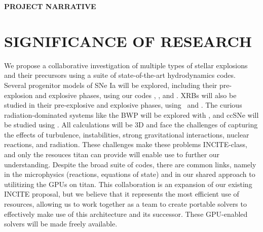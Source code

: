 \documentclass[11pt,letterpaper,english]{article}
\begin{document}
\pagestyle{fancy} 
 \renewcommand{%
\headrulewidth}{0.0pt}

\begin{center}
{\bf PROJECT NARRATIVE}
\end{center}


\section{SIGNIFICANCE OF RESEARCH}


We propose a collaborative investigation of multiple types of stellar
explosions and their precursors using a suite of state-of-the-art
hydrodynamics codes.  Several progenitor models of SNe Ia will be
explored, including their pre-explosion and explosive phases, using
our codes \maestro, \castro, and \flash.  XRBs will also be studied in
their pre-explosive and explosive phases, using \maestro\ and \castro.
The curious radiation-dominated systems like the BWP will be explored
with \castro, and ccSNe will be studied using \chimera.  All
calculations will be 3D and face the challenges of
capturing the effects of turbulence, instabilities, strong
gravitational interactions, nuclear reactions, and radiation.  These
challenges make these problems INCITE-class, and only the resouces
titan can provide will enable use to further our understanding.
Despite the broad suite of codes, there are common links, namely in
the microphysics (reactions, equations of state) and in our shared
approach to utilitizing the GPUs on titan.  This collaboration is an
expansion of our existing INCITE proposal, but we believe that it
represents the most efficient use of resources, allowing us to work
together as a team to create portable solvers to effectively make use
of this architecture and its successor.  These GPU-enabled solvers
will be made freely available.
\end{document}
